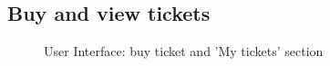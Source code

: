 \subsection{Buy and view tickets}
\label{subsec:ticket}
\begin{figure}[!h]
	\centering
	\caption{User Interface: buy ticket and 'My tickets' section}
\end{figure}
\clearpage